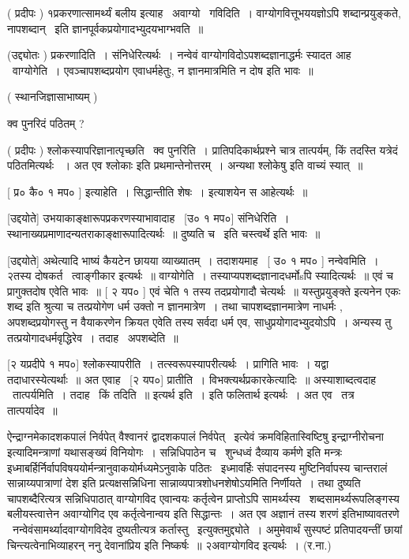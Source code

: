 \documentclass[11pt, openany]{book}
\begin{document}
 ( प्रदीपः ) १प्रकरणात्सामर्थ्यं बलीय इत्याह \textendash\ अवाग्यो \textendash\ गविदिति~। 
वाग्योगवित्तूभययज्ञोऽपि शब्दान्प्रयुङ्कते, नापशब्दान् \textendash\ इति
ज्ञानपूर्वकप्रयोगादभ्युदयभाग्भवति~॥ 

 (उद्द्योतः ) प्रकरणादिति~। संनिधेरित्यर्थः~। नन्वेवं
वाग्योगविदोऽपशब्दज्ञानाद्धर्मः स्यादत आह \textendash\ वाग्योगेति~। 
एवञ्चापशब्दप्रयोग एवाधर्महेतुः, न ज्ञानमात्रमिति न दोष इति भावः~॥ 

 ( स्थानजिज्ञासाभाष्यम् ) 

क्व पुनरिदं पठितम् ? 

 ( प्रदीपः ) श्लोकस्यापरिज्ञानात्पृच्छति \textendash\ क्व पुनरिति~। 
प्रातिपदिकार्थप्रश्ने चात्र तात्पर्यम्, किं तदस्ति यत्रेदं पठितमित्यर्थः
~। अत एव {\qt श्लोकाः} इति प्रथमान्तेनोत्तरम्~। अन्यथा {\qt श्लोकेषु} इति वाच्यं
स्यात्~॥



 [ प्र० कै० १ मप० ] इत्याहेति~। सिद्धान्तीति शेषः~। इत्याशयेन स
आहेत्यर्थः~॥ 

 [उद्दयोते] उभयाकाङ्क्षारूपप्रकरणस्याभावादाह \textendash\ [उ० १ मप०]
संनिधेरिति~। स्थानाख्यप्रमाणादन्यतराकाङ्क्षारूपादित्यर्थः~॥ दुष्यति
च \textendash\ इति चस्त्वर्थे इति भावः~॥ 

 [उद्दयोते] अथेत्यादि भाष्यं कैयटेन छायया व्याख्यातम्~। 
तदाशयमाह \textendash\ [ उ० १ मप० ] नन्वेवमिति~। २तस्य दोषकर्त \textendash\ त्वाङ्गीकार
इत्यर्थः~॥ वाग्योगेति~। तस्याप्यपशब्दज्ञानादधर्मोsपि स्यादित्यर्थः~॥
एवं च प्रागुक्तदोष एवेति भावः~॥ [ २ यप० ] एवं चेति १ तस्य
तदप्रयोगादौ चेत्यर्थः~॥ {\qt यस्तुप्रयुङ्क्ते} इत्यनेन एकः शब्द इति
श्रुत्या च तत्प्रयोगेण धर्म उक्तो न ज्ञानमात्रेण~। तथा
चापशब्दज्ञानमात्रेण नाधर्मः , अपशब्दप्रयोगस्तु न वैयाकरणेन क्रियत एवेति
तस्य सर्वदा धर्म एव, साधुप्रयोगादभ्युदयोऽपि~। अन्यस्य तु
तत्प्रयोगादधर्मवृद्धिरेव~। तदाह \textendash\ अपशब्देति~॥ 

 [२ यप्रदीपे १ मप०] श्लोकस्यापरीति~। तत्स्वरूपस्यापरीत्यर्थः~। 
प्रागिति भावः~। यद्वा तदाधारस्येत्यर्थाः~॥ अत एवाह \textendash\ [२ यप०]
प्रातीति~। विभक्त्यर्थप्रकारकेत्यादिः~॥
अस्याशाब्दत्वदाह \textendash\ तात्पर्यमिति~। तदाह \textendash\ किं तदिति~॥ इत्यर्थ इति~। 
इति फलितार्थ इत्यर्थः~। अत एव \textendash\ तत्र तात्पर्यादेव~॥ 



ऐन्द्राग्नमेकादशकपालं निर्वपेत् वैश्वानरं द्वादशकपालं निर्वपेत् \textendash\ इत्येवं
क्रमविहितास्विष्टिषु {\qt इन्द्राग्नीरोचना \textendash\ } इत्यादिमन्त्राणां यथासङ्ख्यं
विनियोगः~। सन्निधिपाठेन च \textendash\ {\qt शुन्धध्वं दैव्याय कर्मणे} इति मन्त्रः
इध्माबर्हिर्निर्वापविषययोर्मन्त्रानुवाकयोर्मध्यमेऽनुवाके
पठितः \textendash\ इध्मावर्हिः संपादनस्य मुष्टिनिर्वापस्य चान्तरालं
सान्नाय्यपात्राणां देश इति प्रत्यक्षसन्निधिना
सान्नाव्यपात्रशोधनशेषोऽयमिति निर्णीयते~। तथा दुष्यति चापशब्दैरित्यत्र
सन्निधिपाठात् वाग्योगविद एवान्वयः कर्तृत्वेन प्राप्तोऽपि
सामर्थ्यस्य \textendash\ शब्दसामर्थ्यरूपलिङ्गस्य बलीयस्त्वात्तेन अवाग्योगिद एव
कर्तृत्वेनान्वय इति सिद्धान्तः~। अत एव {\qt अज्ञानं तस्य शरणं}
इतिभाष्यावतरणे \textendash\ नन्वेवंसामर्थ्यादवाग्योगविदेव दुष्यतीत्यत्र
कर्तास्तु \textendash\ इत्युक्तमुद्द्योते~। अमुमेवार्थं सुस्पष्टं प्रतिपादयन्तीं
छायां चिन्त्यत्वेनाभिव्याहरन् ननु देवानांप्रिय इति निष्कर्षः~॥
२अवाग्योगविद इत्यर्थः~। (र.ना.) 
\end{document}
